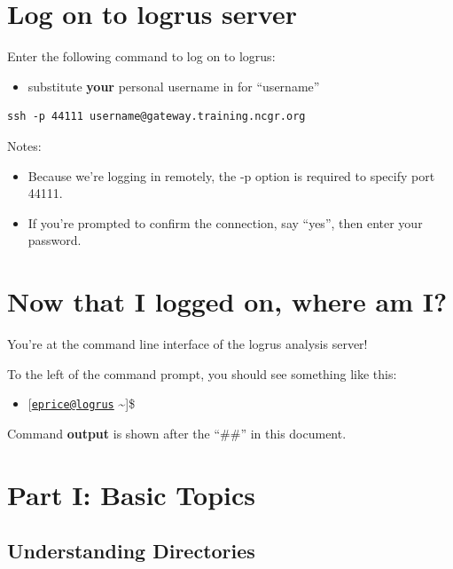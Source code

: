 \documentclass[
]{book}
\providecommand{\tightlist}{%
  \setlength{\itemsep}{0pt}\setlength{\parskip}{0pt}}
\begin{document}
\hypertarget{log-on-to-logrus-server}{%
\section{Log on to logrus server}\label{log-on-to-logrus-server}}

Enter the following command to log on to logrus:

\begin{itemize}
\tightlist
\item
  substitute \textbf{your} personal username in for ``username''
\end{itemize}

\begin{verbatim}
ssh -p 44111 username@gateway.training.ncgr.org
\end{verbatim}

Notes:

\begin{itemize}
\tightlist
\item
  Because we're logging in remotely, the -p option is required to specify port 44111.
\item
  If you're prompted to confirm the connection, say ``yes'', then enter your password.
\end{itemize}

\hypertarget{now-that-i-logged-on-where-am-i}{%
\section{Now that I logged on, where am I?}\label{now-that-i-logged-on-where-am-i}}

You're at the command line interface of the logrus analysis server!

To the left of the command prompt, you should see something like this:

\begin{itemize}
\tightlist
\item
  {[}\href{mailto:eprice@logrus}{\nolinkurl{eprice@logrus}} \textasciitilde{]}\$
\end{itemize}

Command \textbf{output} is shown after the ``\#\#'' in this document.

\hypertarget{part-i-basic-topics}{%
\section{Part I: Basic Topics}\label{part-i-basic-topics}}

\hypertarget{understanding-directories}{%
\subsection{Understanding Directories}\label{understanding-directories}}
\end{document}
